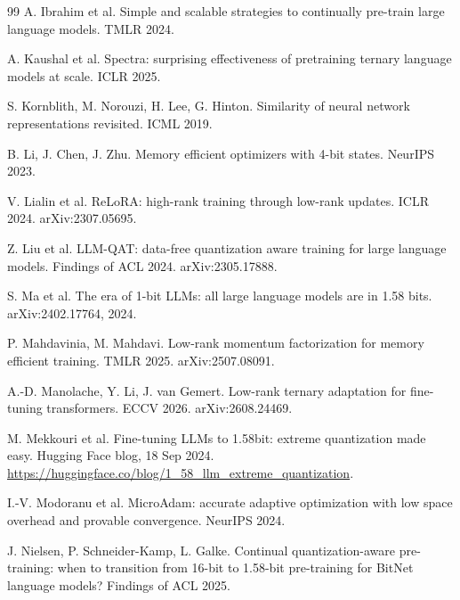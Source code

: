 \documentclass[10pt,twocolumn]{article}
\begin{document}
\begin{thebibliography}{99}
 A. Ibrahim et al. Simple and scalable strategies to continually
  pre-train large language models. TMLR 2024.

 A. Kaushal et al. Spectra: surprising effectiveness of pretraining
  ternary language models at scale. ICLR 2025.

 S. Kornblith, M. Norouzi, H. Lee, G. Hinton. Similarity of
  neural network representations revisited. ICML 2019.

 B. Li, J. Chen, J. Zhu. Memory efficient optimizers with 4-bit states. NeurIPS
  2023.

 V. Lialin et al. ReLoRA: high-rank training through low-rank updates.
  ICLR 2024. arXiv:2307.05695.

 Z. Liu et al. LLM-QAT: data-free quantization aware training for large
  language models. Findings of ACL 2024. arXiv:2305.17888.

 S. Ma et al. The era of 1-bit LLMs: all large language models are in 1.58 bits.
  arXiv:2402.17764, 2024.

 P. Mahdavinia, M. Mahdavi. Low-rank momentum factorization
  for memory efficient training. TMLR 2025. arXiv:2507.08091.

 A.-D. Manolache, Y. Li, J. van Gemert. Low-rank ternary adaptation for
  fine-tuning transformers. ECCV 2026. arXiv:2608.24469.

 M. Mekkouri et al. Fine-tuning LLMs to 1.58bit: extreme
  quantization made easy. Hugging Face blog, 18 Sep 2024. \url{https://huggingface.co/blog/1_58_llm_extreme_quantization}.

 I.-V. Modoranu et al. MicroAdam: accurate adaptive optimization
  with low space overhead and provable convergence. NeurIPS 2024.

 J. Nielsen, P. Schneider-Kamp, L. Galke. Continual
  quantization-aware pre-training: when to transition from 16-bit to 1.58-bit pre-training for BitNet language models?
  Findings of ACL 2025.


\end{thebibliography}
\end{document}
